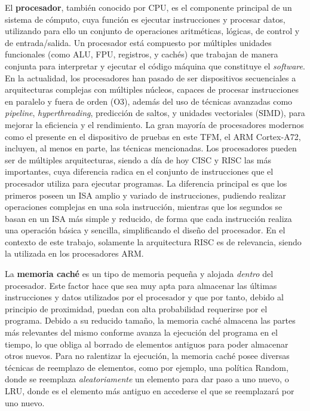 \par{El \textbf{procesador}, también conocido por \ac{CPU}, es el componente principal de un sistema de cómputo, cuya función es ejecutar instrucciones y procesar datos, utilizando para ello un conjunto de operaciones aritméticas, lógicas, de control y de entrada/salida. Un procesador está compuesto por múltiples unidades funcionales (como \ac{ALU}, \ac{FPU}, registros, y cachés) que trabajan de manera conjunta para interpretar y ejecutar el código máquina que constituye el \textit{software}. En la actualidad, los procesadores han pasado de ser dispositivos secuenciales a arquitecturas complejas con múltiples núcleos, capaces de procesar instrucciones en paralelo y fuera de orden (\ac{O3}), además del uso de técnicas avanzadas como \textit{pipeline}, \textit{hyperthreading}, predicción de saltos, y unidades vectoriales (\ac{SIMD}), para mejorar la eficiencia y el rendimiento. La gran mayoría de procesadores modernos como el presente en el dispositivo de pruebas en este \ac{TFM}, el \ac{ARM} Cortex-A72, incluyen, al menos en parte, las técnicas mencionadas. Los procesadores pueden ser de múltiples arquitecturas, siendo a día de hoy \ac{CISC} y \ac{RISC} las más importantes, cuya diferencia radica en el conjunto de instrucciones que el procesador utiliza para ejecutar programas. La diferencia principal es que los primeros poseen un \ac{ISA} amplio y variado de instrucciones, pudiendo realizar operaciones complejas en una sola instrucción, mientras que los segundos se basan en un \ac{ISA} más simple y reducido, de forma que cada instrucción realiza una operación básica y sencilla, simplificando el diseño del procesador. En el contexto de este trabajo, solamente la arquitectura \ac{RISC} es de relevancia, siendo la utilizada en los procesadores \ac{ARM}.}

\par{La \textbf{memoria caché} es un tipo de memoria pequeña y alojada \textit{dentro} del procesador. Este factor hace que sea muy apta para almacenar las últimas instrucciones y datos utilizados por el procesador y que por tanto, debido al principio de proximidad, puedan con alta probabilidad requerirse por el programa. Debido a su reducido tamaño, la memoria caché almacena las partes más relevantes del mismo conforme avanza la ejecución del programa en el tiempo, lo que obliga al borrado de elementos antiguos para poder almacenar otros nuevos. Para no ralentizar la ejecución, la memoria caché posee diversas técnicas de reemplazo de elementos, como por ejemplo, una política Random, donde se reemplaza \textit{aleatoriamente} un elemento para dar paso a uno nuevo, o \ac{LRU}, donde es el elemento más antiguo en accederse el que se reemplazará por uno nuevo.}

